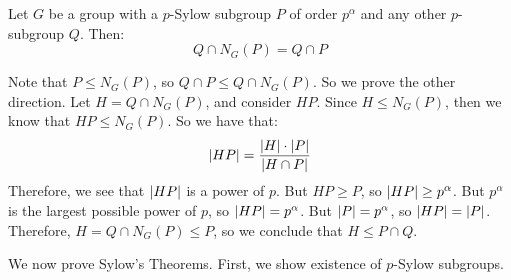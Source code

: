 \begin{thm}
    Let $ G $ be a group with a $ p $-Sylow subgroup $ P $ of order $ p^{\alpha} $
    and any other $ p $-subgroup $ Q $. Then:
    \begin{equation*}
        Q \cap N_{G}(P) = Q \cap P
    \end{equation*}
\end{thm}

\begin{pf}[source=Primary Source Material]
    Note that $ P \leq N_{G}(P) $, so $ Q \cap P \leq Q \cap N_{G}(P) $.
    So we prove the other direction. \vsp
    Let $ H = Q \cap N_{G}(P) $, and consider $ HP $.
    Since $ H \leq N_{G}(P) $, then we know that $ HP \leq N_{G}(P) $. So we have that:
    \begin{equation*}
        \abs{HP} = \frac{\abs{H}\cdot\abs{P}}{\abs{H \cap P}}
    \end{equation*}
    Therefore, we see that $ \abs{HP} $ is a power of $ p $.
    But $ HP \geq P $, so $ \abs{HP} \geq p^{\alpha} $.
    But $ p^{\alpha} $ is the largest possible power of $ p $, so $ \abs{HP} = p^{\alpha} $.
    But $ \abs{P} = p^{\alpha} $, so $ \abs{HP} = \abs{P} $.
    Therefore, $ H = Q \cap N_{G}(P) \leq P $, so we conclude that $ H \leq P \cap Q $.
\end{pf}

\newpage
We now prove Sylow's Theorems. First, we show existence of $ p $-Sylow subgroups.

